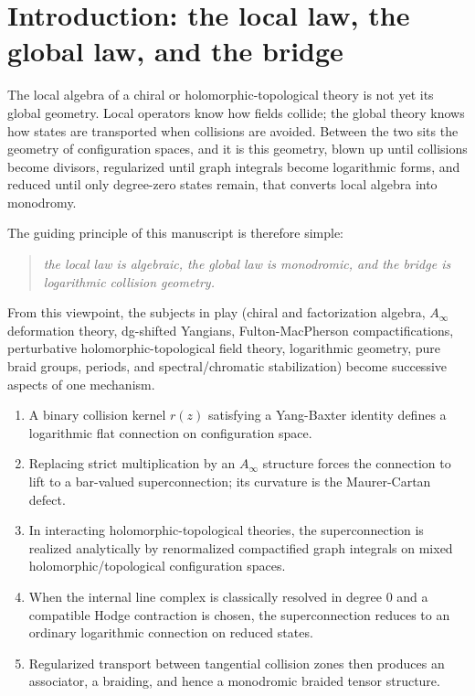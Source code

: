 \section{Introduction: the local law, the global law, and the bridge}

The local algebra of a chiral or holomorphic-topological theory is not yet its global geometry. Local operators know how fields collide; the global theory knows how states are transported when collisions are avoided. Between the two sits the geometry of configuration spaces, and it is this geometry, blown up until collisions become divisors, regularized until graph integrals become logarithmic forms, and reduced until only degree-zero states remain, that converts local algebra into monodromy.

The guiding principle of this manuscript is therefore simple:
\begin{quote}
\emph{the local law is algebraic, the global law is monodromic, and the bridge is logarithmic collision geometry.}
\end{quote}

From this viewpoint, the subjects in play (chiral and factorization algebra, $A_\infty$ deformation theory, dg-shifted Yangians, Fulton-MacPherson compactifications, perturbative holomorphic-topological field theory, logarithmic geometry, pure braid groups, periods, and spectral/chromatic stabilization) become successive aspects of one mechanism.
\begin{enumerate}[label=\textup{(\arabic*)}]
 \item A binary collision kernel $r(z)$ satisfying a Yang-Baxter identity defines a logarithmic flat connection on configuration space.
 \item Replacing strict multiplication by an $A_\infty$ structure forces the connection to lift to a bar-valued superconnection; its curvature is the Maurer-Cartan defect.
 \item In interacting holomorphic-topological theories, the superconnection is realized analytically by renormalized compactified graph integrals on mixed holomorphic/topological configuration spaces.
 \item When the internal line complex is classically resolved in degree $0$ and a compatible Hodge contraction is chosen, the superconnection reduces to an ordinary logarithmic connection on reduced states.
 \item Regularized transport between tangential collision zones then produces an associator, a braiding, and hence a monodromic braided tensor structure.
\end{enumerate}

